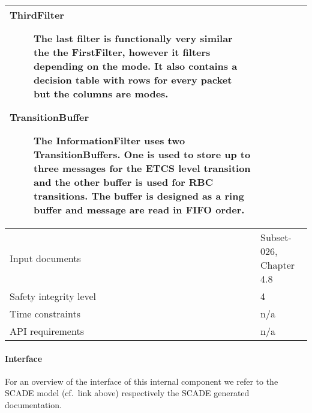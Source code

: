 \begin{longtable}{p{}p{}}
\begin{description}
\item[ThirdFilter] The last filter is functionally very similar
the the FirstFilter, however it filters depending on the mode. It also
contains a decision table with rows for every packet but the columns
are modes.

\item[TransitionBuffer] The InformationFilter uses two
TransitionBuffers. One is used to store up to three messages for the
ETCS level transition and the other buffer is used for RBC
transitions. The buffer is designed as a ring buffer and message are
read in FIFO order.
\end{description} \\
\midrule
Input documents	& 
  Subset-026, Chapter 4.8 \\
\midrule
Safety integrity level	& 4 \\
\midrule
Time constraints		& n/a \\
\midrule
API requirements 		& n/a \\
\bottomrule
\end{longtable}


\paragraph{Interface}

For an overview of the interface of this internal component we refer to the SCADE model (cf.~link above) respectively the SCADE generated documentation.